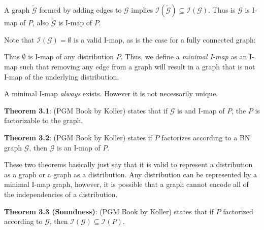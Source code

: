 \documentclass[11pt]{article}
\newcommand{\SetOf}[1]{\mathbf{#1}} %
\newcommand{\italic}[1]{\textit{#1}} %
\newcommand{\boldFace}[1]{\textbf{#1}} %
\newcommand{\cursive}[1]{\mathcal{#1}}
\begin{document}

	A graph $\cursive{\tilde{G}}$ formed by adding edges to $\cursive{G}$ implies $\cursive{I}(\cursive{\tilde{G}}) \subseteq \cursive{I}(\cursive{G})$. Thus is $\cursive{G}$ is I-map of $P$, also $\cursive{\tilde{G}}$ is I-map of $P$.

	Note that $\cursive{I}(\cursive{G})=\emptyset$ is a valid I-map, as is the case for a fully connected graph:
	\begin{center}
	\end{center}

	Thus $\emptyset$ is I-map of any distribution $P$. Thus, we define a \italic{minimal I-map} as an I-map such that removing any edge from a graph will result in a graph that is not I-map of the underlying distribution.

	A minimal I-map \italic{always} exists. However it is not necessarily unique. 

	\boldFace{Theorem 3.1}: (PGM Book by Koller) states that if $\cursive{G}$ is and I-map of $P$, the $P$ is factorizable to the graph.

	\boldFace{Theorem 3.2}: (PGM Book by Koller) states if $P$ factorizes according to a BN graph $\cursive{G}$, then $\cursive{G}$ is an I-map of $P$.

	These two theorems basically just say that it is valid to represent a distribution as a graph or a graph as a distribution. Any distribution can be represented by a minimal I-map graph, however, it is possible that a graph cannot encode all of the independencies of a distribution. 

	\boldFace{Theorem 3.3 (Soundness)}: (PGM Book by Koller) states that if $P$ factorized according to $\cursive{G}$, then $\cursive{I}(\cursive{G}) \subseteq \cursive{I}(P)$.
\end{document}

